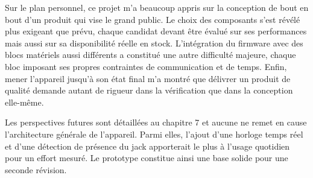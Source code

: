 Sur le plan personnel, ce projet m'a beaucoup appris sur la conception de bout en bout d'un produit qui vise le grand public. Le choix des composants s'est révélé plus exigeant que prévu, chaque candidat devant être évalué sur ses performances mais aussi sur sa disponibilité réelle en stock. L'intégration du firmware avec des blocs matériels aussi différents a constitué une autre difficulté majeure, chaque bloc imposant ses propres contraintes de communication et de temps. Enfin, mener l'appareil jusqu'à son état final m'a montré que délivrer un produit de qualité demande autant de rigueur dans la vérification que dans la conception elle-même.

Les perspectives futures sont détaillées au chapitre 7 et aucune ne remet en cause l'architecture générale de l'appareil. Parmi elles, l'ajout d'une horloge temps réel et d'une détection de présence du jack apporterait le plus à l'usage quotidien pour un effort mesuré. Le prototype constitue ainsi une base solide pour une seconde révision.



\vfil
\hspace{8cm}\makeatletter\@author\makeatother\par
\hspace{8cm}\begin{minipage}{5cm}
    \printsignature
\end{minipage}